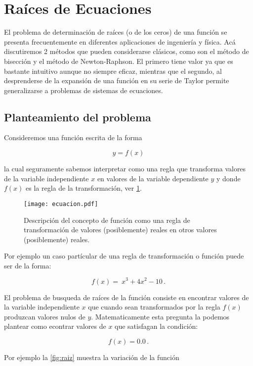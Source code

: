 \section{Raíces de Ecuaciones}
El problema de determinación de raíces (o de los ceros) de una función se presenta frecuentemente en diferentes aplicaciones de ingeniería y física. Acá discutiremos 2 métodos que pueden considerarse clásicos, como son el método de bisección y el método de Newton-Raphson. El primero tiene valor ya que es bastante intuitivo aunque no siempre eficaz, mientras que el segundo, al desprenderse de la expansión de una función en su serie de Taylor permite generalizarse a problemas de sistemas de ecuaciones.

\subsection{Planteamiento del problema}

Consideremos una función escrita de la forma

\begin{equation}
y=f(x)
\label{funcionY}
\end{equation}

la cual seguramente sabemos interpretar como una regla que transforma valores de la variable independiente $x$ en valores de la variable dependiente $y$ y donde $f(x)$ es la regla de la transformación, ver \cref{fig:ecuacion}.

\begin{figure}[H]
	\centering
	\texttt{[image: ecuacion.pdf]}
	\caption{Descripción del concepto de función como una regla de transformación de valores (posiblemente) reales  en otros valores (posiblemente) reales.}
	\label{fig:ecuacion}
\end{figure}

Por ejemplo un caso partícular de una regla de transformación o función puede ser de la forma:

\[f(x) = \ x^3 + 4x^2 - 10\, .\]

El problema de busqueda de raíces de la función consiste en encontrar valores de la variable independiente $x$ que cuando sean transformados por la regla $f(x)$ produzcan valores nulos de $y.$ Matematicamente esta pregunta la podemos plantear como econtrar valores de $x$ que satisfagan la condición:

\[f(x) = 0.0\, .\]

Por ejemplo la \cref{fig:raiz} muestra la variación de la función

